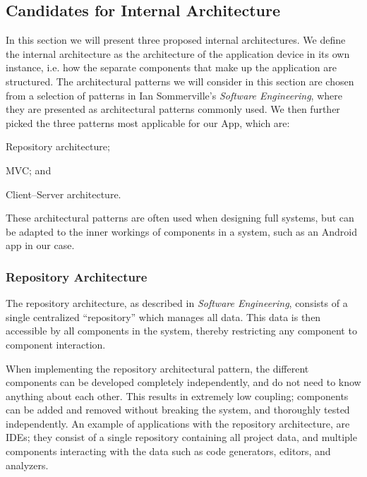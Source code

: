 \subsection{Candidates for Internal Architecture}
In this section we will present three proposed internal architectures.
We define the internal architecture as the architecture of the application device in its own instance, i.e. how the separate components that make up the application are structured.
The architectural patterns we will consider in this section are chosen from a selection of patterns in Ian Sommerville's \textit{Software Engineering}\citep[p. 175-184]{sommerville}, where they are presented as architectural patterns commonly used.
We then further picked the three patterns most applicable for our App, which are:
\begin{eletterate*}
    \item Repository architecture;
    \item \ac{MVC}; and
    \item Client--Server architecture.
\end{eletterate*}
These architectural patterns are often used when designing full systems, but can be adapted to the inner workings of components in a system, such as an Android app in our case.

\subsubsection{Repository Architecture}
The repository architecture, as described in \textit{Software Engineering}\cite[p. 179-180]{sommerville}, consists of a single centralized \enquote{repository} which manages all data.
This data is then accessible by all components in the system, thereby restricting any component to component interaction.

When implementing the repository architectural pattern, the different components can be developed completely independently, and do not need to know anything about each other.
This results in extremely low coupling; components can be added and removed without breaking the system, and thoroughly tested independently.
An example of applications with the repository architecture, are IDEs; they consist of a single repository containing all project data, and multiple components interacting with the data such as code generators, editors, and analyzers.

